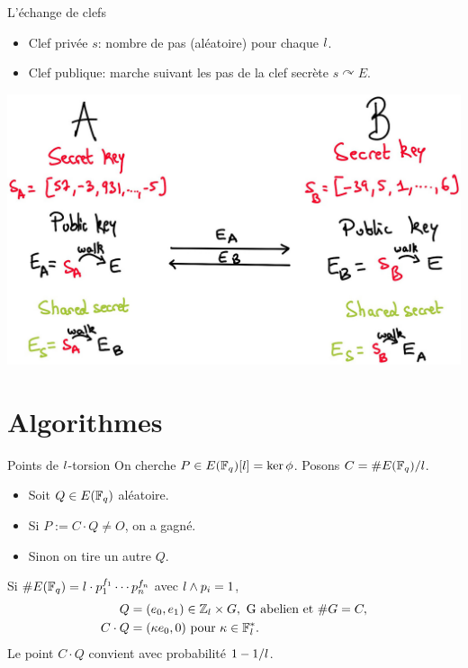 \documentclass{beamer}
\begin{document}
\begin{frame}{L'\'echange de clefs}
	\begin{itemize}
		\item Clef priv\'ee $s$: nombre de pas (al\'eatoire) pour chaque $\mathnormal{l}$.
		\item Clef publique: marche suivant les pas de la clef secr\`ete $s\curvearrowright E$.
	\end{itemize}
\begin{center}
	\includegraphics[scale=0.2]{../figs/DH}
\end{center}
\end{frame}

\section{Algorithmes}
\begin{frame}{Points de $\mathnormal{l}$-torsion}
	On cherche $P\in E(\mathbb{F}_q)[\mathnormal{l}] = \ker\phi$. Posons $C = \#E(\mathbb{F}_q) / \mathnormal{l}$.
	\begin{itemize}
		\item Soit $Q\in E(\mathbb{F}_q)$ al\'eatoire.
		\item Si $P := C\cdot Q \neq O$, on a gagn\'e.
		\item Sinon on tire un autre $Q$.
	\end{itemize}
	Si $\#E(\mathbb{F}_q) = \mathnormal{l} \cdot p_1 ^{f_1}\cdots p_n^{f_n}$ avec $\mathnormal{l}\wedge p_i = 1$,
	\begin{align*}
		Q &= (e_0, e_1)\in \mathbb{Z}_{\mathnormal{l}}\times G, \text{ G abelien et }\#G = C, \\
		C\cdot Q &= (\kappa e_0, 0) \text{ pour } \kappa\in \mathbb{F}_{\mathnormal{l}}^{*}.
	\end{align*}
	Le point $C\cdot Q$ convient avec probabilit\'e $1-1/\mathnormal{l}$.
\end{frame}
\end{document}
